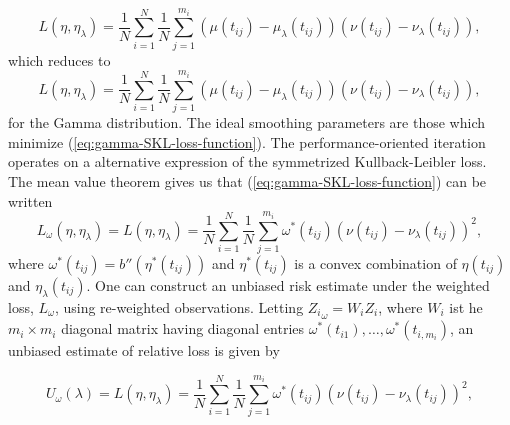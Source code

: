 \begin{equation}\label{eq:SKL-loss-function}
L\left( \eta,\eta_\lambda \right) = \frac{1}{N}\sum_{i=1}^N \frac{1}{N}\sum_{j=1}^{m_i}  \left(\mu\left(t_{ij}\right) - \mu_\lambda \left(t_{ij}\right)\right)\left( \nu\left(t_{ij}\right) - \nu_\lambda\left(t_{ij}\right)\right),
\end{equation}
\noindent
which reduces to 
\begin{equation}\label{eq:gamma-SKL-loss-function}
L\left( \eta,\eta_\lambda \right) = \frac{1}{N}\sum_{i=1}^N \frac{1}{N}\sum_{j=1}^{m_i}  \left(\mu\left(t_{ij}\right) - \mu_\lambda \left(t_{ij}\right)\right)\left( \nu\left(t_{ij}\right) - \nu_\lambda\left(t_{ij}\right)\right),
\end{equation}
\noindent
for the Gamma distribution. The ideal smoothing parameters are those which minimize (\ref{eq:gamma-SKL-loss-function}). The performance-oriented iteration operates on a alternative expression of the symmetrized Kullback-Leibler loss. The mean value theorem gives us that (\ref{eq:gamma-SKL-loss-function}) can be written
\begin{equation}\label{eq:gamma-SKL-loss-function-mvt}
L_\omega\left( \eta,\eta_\lambda \right) = L\left( \eta,\eta_\lambda \right) = \frac{1}{N}\sum_{i=1}^N \frac{1}{N}\sum_{j=1}^{m_i} \omega^*\left(t_{ij}\right)  \left( \nu\left(t_{ij}\right) - \nu_\lambda\left(t_{ij}\right)\right)^2,
\end{equation}
\noindent
where $\omega^*\left(t_{ij}\right) = b''\left(\eta^*\left(t_{ij}\right)\right)$ and $\eta^*\left(t_{ij}\right)$ is a convex combination of  $\eta\left(t_{ij}\right)$ and $\eta_\lambda\left(t_{ij}\right)$. One can construct an unbiased risk estimate under the weighted loss, $L_\omega$, using re-weighted observations. Letting ${Z_{i}}_\omega = W_i Z_i$, where $W_i$ ist he $m_i \times m_i$ diagonal matrix having diagonal entries $\omega^*\left(t_{i1}\right), \dots, \omega^*\left(t_{i,m_i}\right)$, an unbiased estimate of relative loss is given by 

\begin{equation}\label{eq:weighted-unbiased-risk-estimate}
U_\omega\left( \lambda \right) = L\left( \eta,\eta_\lambda \right) = \frac{1}{N}\sum_{i=1}^N \frac{1}{N}\sum_{j=1}^{m_i} \omega^*\left(t_{ij}\right)  \left( \nu\left(t_{ij}\right) - \nu_\lambda\left(t_{ij}\right)\right)^2,
\end{equation}





%
%
%
